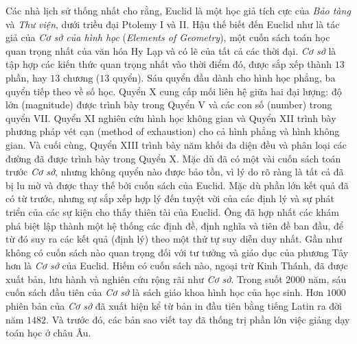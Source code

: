 \begin{multicols}{2}
	\vskip 0.1cm
	Các nhà lịch sử thống nhất cho rằng, Euclid là một học giả tích cực của \textit{Bảo tàng} và \textit{Thư viện}, dưới triều đại Ptolemy I và II. 
	\vskip 0.1cm
	Hậu thế biết đến Euclid như là tác giả của \textit{Cơ sở của hình học} (\textit{Elements of Geometry}), một cuốn sách toán học quan trọng nhất của văn hóa Hy Lạp và có lẽ của tất cả các thời đại. \textit{Cơ sở} là tập hợp các kiến thức quan trọng nhất vào thời điểm đó, được sắp xếp thành $13$ phần, hay $13$ chương ($13$ quyển). Sáu quyển đầu dành cho hình học phẳng, ba quyển tiếp theo về số học. Quyển X cung cấp mối liên hệ giữa hai đại lượng: độ lớn (magnitude) được trình bày trong Quyển V và các con số (number) trong quyển VII. Quyển XI nghiên cứu hình học không gian và Quyển XII trình bày phương pháp vét cạn (method of exhaustion) cho cả hình phẳng và hình không gian. Và cuối cùng, Quyển XIII trình bày năm khối đa diện đều và phân loại các đường đã được trình bày trong Quyển X.   
	\vskip 0.1cm
	Mặc dù đã có một vài cuốn sách toán trước \textit{Cơ sở}, nhưng không quyển nào được bảo  tồn, vì lý do rõ ràng là tất cả đã bị lu mờ và được thay thế bởi cuốn sách của Euclid.
	\vskip 0.1cm
	Mặc dù phần lớn kết quả đã có từ trước, nhưng sự sắp xếp hợp lý đến tuyệt vời của các định lý và sự phát triển của các sự kiện cho thấy thiên tài của Euclid. Ông đã hợp nhất các khám phá biệt lập thành một hệ thống các định đề, định nghĩa và tiên đề ban đầu, để từ đó suy ra các kết quả (định lý) theo một thứ tự suy diễn duy nhất.
	\vskip 0.1cm
	Gần như không có cuốn sách nào quan trọng đối với tư tưởng và giáo dục của phương Tây hơn là \textit{Cơ sở} của Euclid. Hiếm có cuốn sách nào, ngoại trừ Kinh Thánh, đã được xuất bản, lưu hành và nghiên cứu rộng rãi như \textit{Cơ sở}. Trong suốt $2000$ năm, sáu cuốn sách đầu tiên của \textit{Cơ sở} là  sách giáo khoa hình học của học sinh. Hơn $1000$ phiên bản của \textit{Cơ sở} đã xuất hiện kể từ bản in đầu tiên bằng tiếng Latin ra đời năm $1482$. Và trước đó, các bản sao viết tay đã thống trị phần lớn việc giảng dạy toán học ở châu Âu.
	\begin{figure}[H]
		\vspace*{-5pt}
		\centering
		\captionsetup{labelformat= empty, justification=centering}

\end{figure}
\end{multicols}
